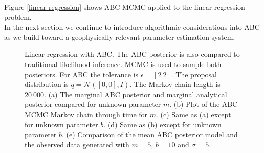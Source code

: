 Figure \ref{linear-regression} shows ABC-MCMC applied to the linear regression problem. \\

In the next section we continue to introduce algorithmic considerations into ABC as we build toward a geophysically relevant parameter estimation system. \\

\begin{figure}[H]	
	\centering
	
	\setlength{}
	\setlength{}
	
		
	\caption{{\sffamily Linear regression with ABC. The ABC posterior is also compared to traditional likelihood inference. MCMC is used to sample both posteriors. For ABC the tolerance is $\epsilon = [2\ 2]$. The proposal distribution is $q = \mathcal{N}([0,0],I)$. The Markov chain length is $20\ 000$. (a) The marginal ABC posterior and marginal analytical posterior compared for unknown parameter $m$. (b) Plot of the ABC-MCMC Markov chain through time for $m$. (c) Same as (a) except for unknown parameter $b$. (d) Same as (b) except for unknown parameter $b$. (e) Comparison of the mean ABC posterior model and the observed data generated with $m = 5$, $b = 10$ and $\sigma = 5$.}}
\end{figure}

